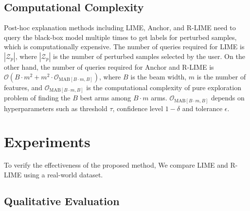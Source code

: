 \documentclass[11pt]{article}
\begin{document}

\ifnum{}
  \subsection{Computational Complexity}
  Post-hoc explanation methods including LIME, Anchor, and R-LIME
  need to query the black-box model multiple times
  to get labels for perturbed samples, which is computationally expensive.
  The number of queries required for LIME is $|\mathcal{Z}_p|$,
  where $|\mathcal{Z}_p|$ is the number of perturbed samples selected by the user.
  On the other hand,
  the number of queries required for Anchor and R-LIME is
  $\mathcal{O}(B\cdot m^2+m^2\cdot\mathcal{O}_{\mathrm{MAB}[B\cdot m,B]})$,
  where $B$ is the beam width, $m$ is the number of features, and
  $\mathcal{O}_{\mathrm{MAB}[B\cdot m,B]}$ is the computational complexity of
  pure exploration problem of finding the $B$ best arms among $B\cdot m$ arms.
  $\mathcal{O}_{\mathrm{MAB}[B\cdot m,B]}$ depends on hyperparameters
  such as threshold $\tau$, confidence level $1-\delta$ and tolerance $\epsilon$.
\fi

\section{Experiments}
To verify the effectiveness of the proposed method,
We compare LIME and R-LIME using a real-world dataset.

\subsection{Qualitative Evaluation}
\end{document}
